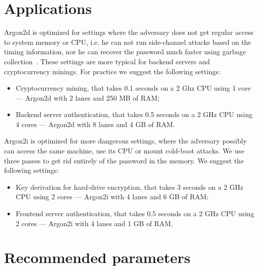 \documentclass[a4paper]{article}
\begin{document}
\section{Applications}
\textsf{Argon2d} is optimized for settings where the adversary does not get regular access to system memory or CPU, i.e. he can not run side-channel attacks based on the timing information, nor he
can recover the password much faster using garbage collection~\cite{cryptoeprint:2014:881}. These settings are more typical for backend servers and cryptocurrency minings. For practice we suggest the following settings:
\begin{itemize}
  \item Cryptocurrency mining, that takes 0.1 seconds on a 2 Ghz CPU using 1 core --- \textsf{Argon2d} with 2 lanes and 250 MB of RAM;
  \item Backend server authentication, that takes 0.5 seconds on a 2 GHz CPU using 4 cores --- \textsf{Argon2d} with 8 lanes and 4 GB of RAM.
\end{itemize}

\textsf{Argon2i} is optimized for more dangerous settings, where the adversary possibly can access the same machine, use its CPU or mount cold-boot attacks. We use three passes to get rid entirely of the password in the memory. We suggest the following settings:
\begin{itemize}
  \item Key derivation for hard-drive encryption, that takes 3 seconds on a 2 GHz CPU using 2 cores --- \textsf{Argon2i} with 4 lanes and 6 GB of RAM;
  \item Frontend server authentication, that takes 0.5 seconds on a 2 GHz CPU using 2 cores --- \textsf{Argon2i} with 4 lanes and 1 GB of RAM.
\end{itemize}

\section{Recommended parameters}
\end{document}
